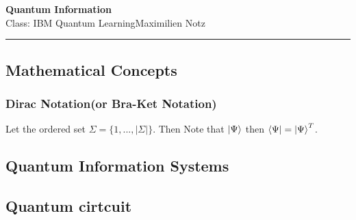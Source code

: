\documentclass[5pt]{article}
\begin{document}
\begin{center}
     \Large{\textbf{Quantum Information}}\\
     \small{Class: IBM Quantum Learning}\hfill\small{\textcopyright Maximilien Notz \the\year{}}
     \noindent\rule{20.2cm}{0.4pt}
\end{center}


\begin{multicols}{3}
\setcounter{secnumdepth}{0}

\subsection{Mathematical Concepts}

\subsubsection{Dirac Notation\footnotesize{(or Bra-Ket Notation)}}
Let the ordered set $\Sigma=\{1,...,|\Sigma|\}$. Then 
Note that $\ket{\Psi}$ then $\bra{\Psi}=\ket{\Psi}^T$.

\subsection{Quantum Information Systems}

\subsection{Quantum cirtcuit}



\end{multicols}
\end{document}
